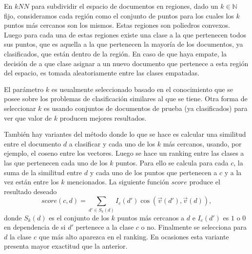\documentclass{llncs}
\begin{document}
		En $kNN$ para subdividir el espacio de documentos en regiones, dado un $k \in \mathbb{N}$ fijo, consideramos cada regi\'on como el conjunto de puntos para los cuales los $k$ puntos m\'as cercanos son los mismos. Estas regiones son poliedros convexos. Luego para cada una de estas regiones existe una clase a la que pertenecen todos sus puntos, que es aquella a la que pertenecen la mayor\'ia de los documentos, ya clasificados, que est\'an dentro de la regi\'on. En caso de que haya empate, la decisi\'on de a que clase asignar a un nuevo documento que pertenece a esta regi\'on del espacio, es tomada aleatoriamente entre las clases empatadas.
		
		El par\'ametro $k$ es usualmente seleccionado basado en el conocimiento que se posee sobre los problemas de clasificaci\'on similares al que se tiene. Otra forma de seleccionar $k$ es usando conjuntos de documentos de prueba (ya clasificados) para ver que valor de $k$ producen mejores resultados.
		
		Tambi\'en hay variantes del m\'etodo donde lo que se hace es calcular una similitud entre el documento $d$ a clasificar y cada uno de los $k$ m\'as cercanos, usando, por ejemplo, el coseno entre los vectores. Luego se hace un ranking entre las clases a las que pertenecen cada uno de los $k$ puntos. Para ello se calcula para cada $c$, la suma de la similitud entre $d$ y cada uno de los puntos que pertenecen a $c$ y a la vez est\'an entre los $k$ mencionados. La siguiente funci\'on $score$ produce el resultado deseado
		\[
			score(c,d)  = \sum_{d'\in S_k(d)} I_c(d') \cos(\overrightarrow{v}(d'),\overrightarrow{v}(d)),
		\]
		donde $S_k(d)$ es el conjunto de los $k$ puntos m\'as cercanos a $d$ e $I_c(d')$ es $1$ o $0$ en dependencia de si $d'$ pertenece a la clase $c$ o no. Finalmente se selecciona para $d$ la clase $c$ que m\'as alto aparezca en el ranking. En ocasiones esta variante presenta mayor exactitud que la anterior.
		
\end{document}
